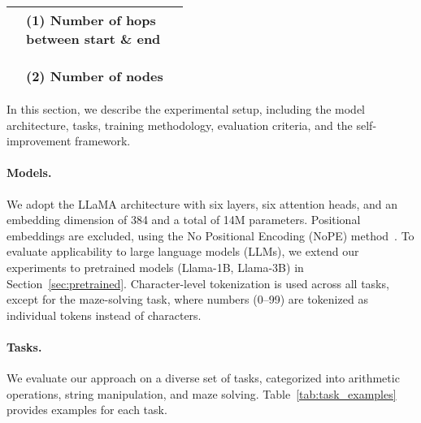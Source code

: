 \begin{table*}
{\begin{tabular}{c|l|c}
\begin{tabularx}{0.6\linewidth}{L@{}L@{}}
\end{tabularx} 
& \shortstack[l]{ (1) Number of hops \\ between start \& end \\ \vspace{1mm} \\ (2) Number of nodes} \\ %

\bottomrule
\end{tabular}
}
\vspace{-3mm}
\end{table*}


In this section, we describe the experimental setup, including the model architecture, tasks, training methodology, evaluation criteria, and the self-improvement framework.

\paragraph{Models. }
We adopt the LLaMA architecture with six layers, six attention heads, and an embedding dimension of 384 and a total of 14M parameters. Positional embeddings are excluded, using the No Positional Encoding (NoPE) method~\citep{kazemnejad2024impact}. To evaluate applicability to large language models (LLMs), we extend our experiments to pretrained models (Llama-1B, Llama-3B) in Section~\ref{sec:pretrained}. Character-level tokenization is used across all tasks, except for the maze-solving task, where numbers (0–99) are tokenized as individual tokens instead of characters.

\paragraph{Tasks. }
We evaluate our approach on a diverse set of tasks, categorized into arithmetic operations, string manipulation, and maze solving. Table~\ref{tab:task_examples} provides examples for each task.

